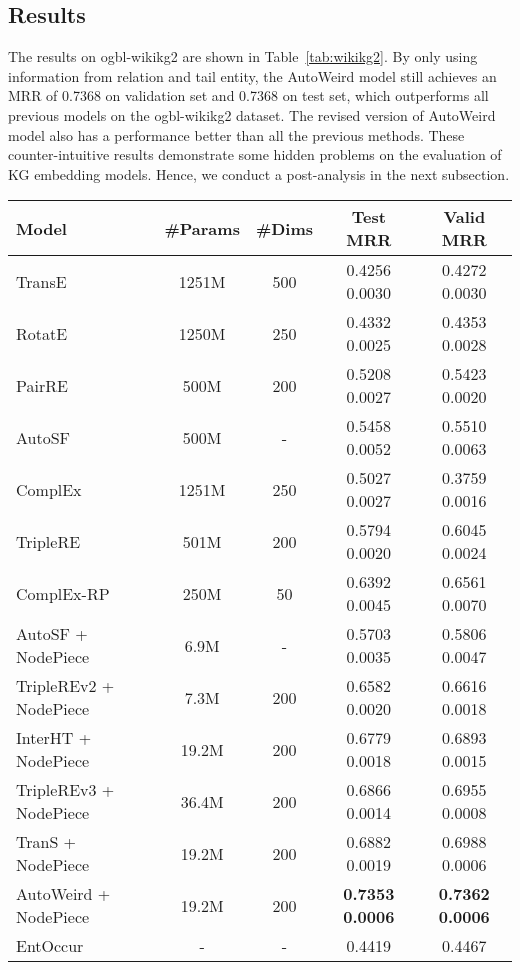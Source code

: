 \documentclass{article}
\begin{document}
\subsection{Results}

The results on ogbl-wikikg2 are shown in Table~\ref{tab:wikikg2}. 
By only using information from relation and tail entity, 
the AutoWeird model still achieves an MRR of 0.7368 on validation set and 0.7368 on test set, 
which outperforms all previous models on the ogbl-wikikg2 dataset. 
The revised version of AutoWeird model also has a performance better than all the previous methods. 
These counter-intuitive results demonstrate some hidden problems on
the evaluation of KG embedding models.
Hence, we conduct a post-analysis in the next subsection.

\begin{table*}[!tp]
	\caption{Results on the ogbl-wikikg2 dataset.}
	\label{tab:wikikg2}
	\centering
	\begin{tabular}{lcccc}
		\toprule
		Model & \#Params & \#Dims & Test MRR & Valid MRR \\
		\midrule
		TransE~\cite{bordes2013translating} & 1251M & 500 & 0.4256  0.0030 & 0.4272  0.0030 \\
		RotatE~\cite{sun2019rotate} & 1250M & 250 & 0.4332  0.0025 & 0.4353  0.0028 \\
		PairRE~\cite{chao2020pairre} & 500M & 200 & 0.5208  0.0027 & 0.5423  0.0020 \\
		AutoSF~\cite{zhang2020autosf} & 500M & - & 0.5458  0.0052 & 0.5510  0.0063 \\
		ComplEx~\cite{complex} & 1251M & 250 & 0.5027  0.0027 & 0.3759  0.0016 \\
		TripleRE~\cite{long2021triplere} & 501M & 200 & 0.5794  0.0020 & 0.6045  0.0024 \\
		\midrule
		ComplEx-RP~\cite{chen2021rp} & 250M & 50 & 0.6392  0.0045 & 0.6561  0.0070 \\
		AutoSF + NodePiece~\cite{galkin2021nodepiece} & 6.9M & - & 0.5703  0.0035 & 0.5806  0.0047 \\
		TripleREv2 + NodePiece~\cite{long2021triplere} & 7.3M & 200 & 0.6582  0.0020 & 0.6616  0.0018 \\
		InterHT + NodePiece~\cite{wang2022interht} & 19.2M & 200 & 0.6779  0.0018 & 0.6893  0.0015  \\
		TripleREv3 + NodePiece~\cite{long2021triplere} & 36.4M & 200 & 0.6866  0.0014 & 0.6955  0.0008 \\
		TranS + NodePiece~\cite{zhang2022trans} & 19.2M & 200 & 0.6882  0.0019 & 0.6988  0.0006 \\
		\midrule
		AutoWeird + NodePiece & 19.2M & 200 & \textbf{0.7353  0.0006} & \textbf{0.7362  0.0006} \\
		\midrule 
		EntOccur & - & - & 0.4419 & 0.4467 \\
		\bottomrule
	\end{tabular}
\end{table*}
\end{document}
